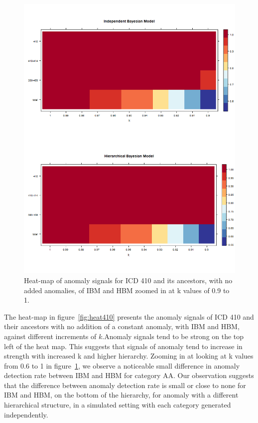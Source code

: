 \begin{figure}[!h]
	\centering
	\includegraphics[width=1\linewidth]{../../R-codes/JAGS/plots/mimic/heat4102}
	\caption{Heat-map of anomaly signals for ICD 410 and its ancestors, with no added anomalies, of IBM and HBM zoomed in at k values of 0.9 to 1.}
	\label{fig:heat4102}
\end{figure}

\newpage

The heat-map in figure~\ref{fig:heat410} presents the anomaly signals of ICD 410 and their ancestors with no addition of a constant anomaly, with IBM and HBM, against different increments of $k$.Anomaly signals tend to be strong on the top left of the heat map. This suggests that signals of anomaly tend to increase in strength with increased k and higher hierarchy. Zooming in at looking at k values from 0.6 to 1 in figure~\ref{fig:heat4102}, we observe a noticeable small difference in anomaly detection rate between IBM and HBM for category AA. Our observation suggests that the difference between anomaly detection rate is small or close to none for IBM and HBM, on the bottom of the hierarchy, for anomaly with a different hierarchical structure, in a simulated setting with each category generated independently. 

